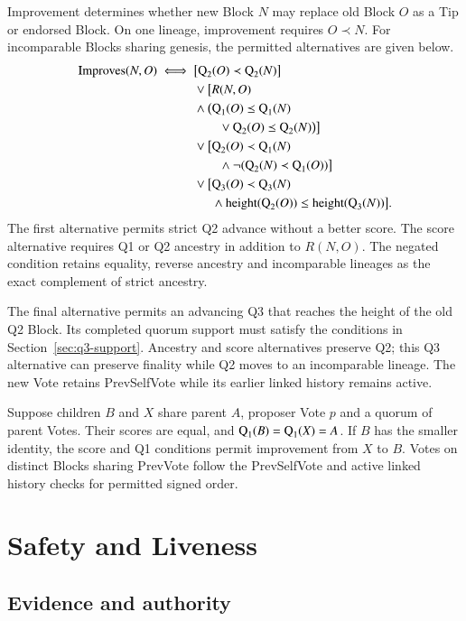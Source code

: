 Improvement determines whether new Block $N$ may replace old Block $O$ as a Tip or endorsed Block.
On one lineage, improvement requires $O\prec N$.
For incomparable Blocks sharing genesis, the permitted alternatives are given below.
\[
\begin{aligned}
\mathrm{Improves}(N,O)\iff{}&
 \bigl[\operatorname{Q}_{2}(O)\prec\operatorname{Q}_{2}(N)\bigr]\\
 &\lor\bigl[R(N,O)\\
 &\land\bigl(\operatorname{Q}_{1}(O)\preceq\operatorname{Q}_{1}(N)\\
 &\hspace{7mm}\lor\operatorname{Q}_{2}(O)\preceq\operatorname{Q}_{2}(N)\bigr)\bigr]\\
 &\lor\bigl[\operatorname{Q}_{2}(O)\prec\operatorname{Q}_{1}(N)\\
 &\hspace{7mm}\land\neg(\operatorname{Q}_{2}(N)\prec\operatorname{Q}_{1}(O))\bigr]\\
 &\lor\bigl[\operatorname{Q}_{3}(O)\prec\operatorname{Q}_{3}(N)\\
 &\hspace{5mm}\land\operatorname{height}(\operatorname{Q}_{2}(O))\leq\operatorname{height}(\operatorname{Q}_{3}(N))\bigr].
\end{aligned}
\]
The first alternative permits strict Q2 advance without a better score.
The score alternative requires Q1 or Q2 ancestry in addition to $R(N,O)$.
The negated condition retains equality, reverse ancestry and incomparable lineages as the exact complement of strict ancestry.

The final alternative permits an advancing Q3 that reaches the height of the old Q2 Block.
Its completed quorum support must satisfy the conditions in Section~\ref{sec:q3-support}.
Ancestry and score alternatives preserve Q2; this Q3 alternative can preserve finality while Q2 moves to an incomparable lineage.
The new Vote retains PrevSelfVote while its earlier linked history remains active.

Suppose children $B$ and $X$ share parent $A$, proposer Vote $p$ and a quorum of parent Votes.
Their scores are equal, and $\operatorname{Q}_{1}(B)=\operatorname{Q}_{1}(X)=A$.
If $B$ has the smaller identity, the score and Q1 conditions permit improvement from $X$ to $B$.
Votes on distinct Blocks sharing PrevVote follow the PrevSelfVote and active linked history checks for permitted signed order.

\section{Safety and Liveness}\label{sec:formal}

\subsection{Evidence and authority}\label{sec:evidence}\label{sec:authority}

